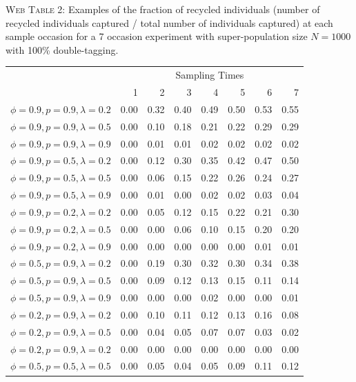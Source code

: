 \documentclass[]{article}
\begin{document}
\textsc{Web Table 2:} Examples of the fraction of recycled individuals
(number of recycled individuals captured / total number of individuals
captured) at each sample occasion for a 7 occasion experiment with
super-population size \(N=1000\) with 100\% double-tagging.

\begin{table}[ht]
\begin{tabular}{rrrrrrrr}
  \hline
  & \multicolumn{7}{c}{Sampling Times}\\
 & 1 & 2 & 3 & 4 & 5 & 6 & 7 \\ 
  \hline
  $\phi=0.9, p=0.9, \lambda=0.2$ & 0.00 & 0.32 & 0.40 & 0.49 & 0.50 & 0.53 & 0.55 \\ 
  $\phi=0.9, p=0.9, \lambda=0.5$ & 0.00 & 0.10 & 0.18 & 0.21 & 0.22 & 0.29 & 0.29 \\ 
  $\phi=0.9, p=0.9, \lambda=0.9$ & 0.00 & 0.01 & 0.01 & 0.02 & 0.02 & 0.02 & 0.02 \\ \hline
  $\phi=0.9, p=0.5, \lambda=0.2$ & 0.00 & 0.12 & 0.30 & 0.35 & 0.42 & 0.47 & 0.50 \\ 
  $\phi=0.9, p=0.5, \lambda=0.5$ & 0.00 & 0.06 & 0.15 & 0.22 & 0.26 & 0.24 & 0.27 \\ 
  $\phi=0.9, p=0.5, \lambda=0.9$ & 0.00 & 0.01 & 0.00 & 0.02 & 0.02 & 0.03 & 0.04 \\ \hline
  $\phi=0.9, p=0.2, \lambda=0.2$ & 0.00 & 0.05 & 0.12 & 0.15 & 0.22 & 0.21 & 0.30 \\ 
  $\phi=0.9, p=0.2, \lambda=0.5$ & 0.00 & 0.00 & 0.06 & 0.10 & 0.15 & 0.20 & 0.20 \\ 
  $\phi=0.9, p=0.2, \lambda=0.9$ & 0.00 & 0.00 & 0.00 & 0.00 & 0.00 & 0.01 & 0.01 \\ \hline
  $\phi=0.5, p=0.9, \lambda=0.2$ & 0.00 & 0.19 & 0.30 & 0.32 & 0.30 & 0.34 & 0.38 \\ 
  $\phi=0.5, p=0.9, \lambda=0.5$ & 0.00 & 0.09 & 0.12 & 0.13 & 0.15 & 0.11 & 0.14 \\ 
  $\phi=0.5, p=0.9, \lambda=0.9$ & 0.00 & 0.00 & 0.00 & 0.02 & 0.00 & 0.00 & 0.01 \\ \hline
  $\phi=0.2, p=0.9, \lambda=0.2$ & 0.00 & 0.10 & 0.11 & 0.12 & 0.13 & 0.16 & 0.08 \\ 
  $\phi=0.2, p=0.9, \lambda=0.5$ & 0.00 & 0.04 & 0.05 & 0.07 & 0.07 & 0.03 & 0.02 \\ 
  $\phi=0.2, p=0.9, \lambda=0.2$ & 0.00 & 0.00 & 0.00 & 0.00 & 0.00 & 0.00 & 0.00 \\ \hline
    $\phi=0.5, p=0.5, \lambda=0.5$ & 0.00 & 0.05 & 0.04 & 0.05 & 0.09 & 0.11 & 0.12 \\ \hline
\end{tabular}
\end{table}
\end{document}

